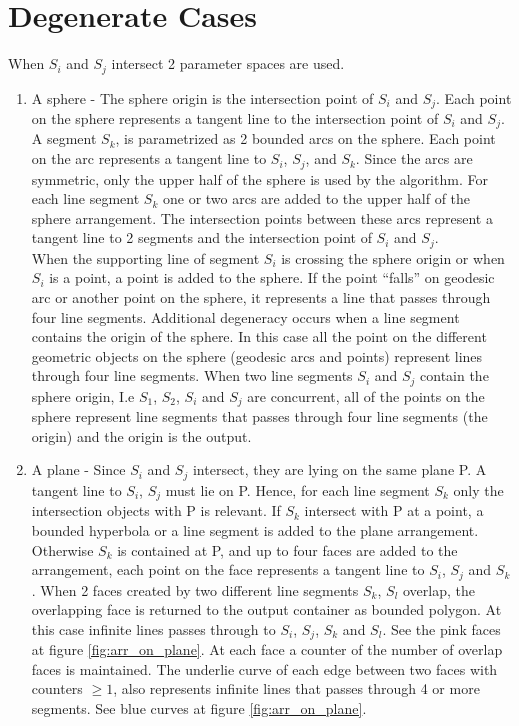 \documentclass[11pt]{article}
\begin{document}
\section{Degenerate Cases}
\label{sec:degenerate}
When $S_i$ and $S_j$ intersect 2 parameter spaces are used.
\begin{enumerate}
\item A sphere - The sphere origin is the intersection point of $S_i$ and $S_j$.
Each point on the sphere represents a tangent line to the intersection point of
$S_i$ and $S_j$. A segment $S_k$, is parametrized as 2 bounded arcs on the 
sphere. Each point on the arc represents a tangent line to $S_i$, $S_j$, and
$S_k$.  Since the arcs are symmetric, only the upper half of the sphere is used
by the algorithm.\newline
For each line segment $S_k$ one or two arcs are added to the upper half of the
sphere arrangement. The intersection points between these arcs represent a
tangent line to 2 segments and the intersection point of $S_i$ and $S_j$.\\
When the supporting line of segment $S_i$ is crossing the sphere origin or
when $S_i$ is a point, a point is added to the sphere. If the point ``falls''
on geodesic arc or another point on the sphere, it represents a line that passes
through four line segments.\newline
Additional degeneracy occurs when a line segment contains the origin of the sphere.
In this case all the point on the different geometric objects on the sphere
(geodesic arcs and points) represent lines through four line segments. When two
line segments $S_i$ and $S_j$ contain the sphere origin, I.e $S_1$, $S_2$, $S_i$
and $S_j$ are concurrent, all of the points on the sphere represent line segments
that passes through four line segments (the origin) and the origin is the output.

\item
A plane - Since $S_i$ and $S_j$ intersect, they are lying on the same plane P. 
A tangent line to $S_i$, $S_j$ must lie on P. Hence, for each line segment $S_k$
only the intersection objects with P is relevant.
If $S_k$ intersect with P at a point, a bounded hyperbola or a line segment is 
added to the plane arrangement. Otherwise $S_k$ is contained at P, and up to 
four faces are added to the arrangement, each point on the face represents a tangent 
line to $S_i$, $S_j$ and $S_k$.
When 2 faces created by two different line segments $S_k$, $S_l$ overlap, the 
overlapping face is returned to the output container as bounded polygon. 
At this case infinite lines passes through to $S_i$, $S_j$, $S_k$ and $S_l$. 
See the pink faces at figure \ref{fig:arr_on_plane}.
At each face a counter of the number of overlap faces is maintained. The underlie 
curve of each edge between two faces with counters $\geq 1$, also represents 
infinite lines that passes through 4 or more segments. 
See blue curves at figure \ref{fig:arr_on_plane}.

\end{enumerate}
\end{document}
